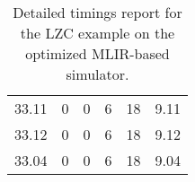 \begin{table}[h]
{\begin{tabular}{cccccc}
            33.11              & 0                          & 0                          & 6                          & 18                         & 9.11                   \\
            33.12              & 0                          & 0                          & 6                          & 18                         & 9.12                   \\
            33.04              & 0                          & 0                          & 6                          & 18                         & 9.04                   \\
            \bottomrule
        \end{tabular}
    }
    \caption{Detailed timings report for the LZC example on the optimized MLIR-based simulator.}
\end{table}

